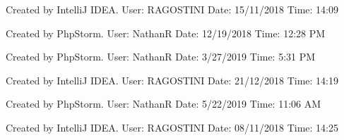 Created by IntelliJ I\+D\+EA. User\+: R\+A\+G\+O\+S\+T\+I\+NI Date\+: 15/11/2018 Time\+: 14\+:09

Created by Php\+Storm. User\+: NathanR Date\+: 12/19/2018 Time\+: 12\+:28 PM

Created by Php\+Storm. User\+: NathanR Date\+: 3/27/2019 Time\+: 5\+:31 PM

Created by IntelliJ I\+D\+EA. User\+: R\+A\+G\+O\+S\+T\+I\+NI Date\+: 21/12/2018 Time\+: 14\+:19

Created by Php\+Storm. User\+: NathanR Date\+: 5/22/2019 Time\+: 11\+:06 AM

Created by IntelliJ I\+D\+EA. User\+: R\+A\+G\+O\+S\+T\+I\+NI Date\+: 08/11/2018 Time\+: 14\+:25 